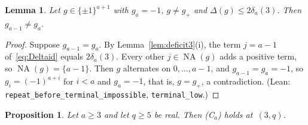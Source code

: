 \documentclass[11pt]{article}
\newtheorem{lemma}[theorem]{Lemma}
\newtheorem{proposition}[theorem]{Proposition}
\theoremstyle{remark}
\newcommand{\NA}{\operatorname{NA}}
\begin{document}
\begin{lemma}\label{lem:terminal}
Let $g\in\{\pm1\}^{a+1}$ with $g_a=-1$, $g\ne g_+$ and $\Delta(g)\le2\delta_a(3)$.
Then $g_{a-1}\ne g_a$.
\end{lemma}
\begin{proof}
Suppose $g_{a-1}=g_a$. By Lemma~\ref{lem:deficit3}(i), the term $j=a-1$
of~\eqref{eq:Deltaid} equals $2\delta_a(3)$. Every other $j\in\NA(g)$ adds a
positive term, so $\NA(g)=\{a-1\}$. Then $g$ alternates on $0,\dots,a-1$, and
$g_{a-1}=g_a=-1$, so $g_i=(-1)^{a+i}$ for $i<a$ and $g_a=-1$, that is, $g=g_+$, a
contradiction. (Lean: \texttt{repeat\_before\_terminal\_impossible},
\texttt{terminal\_low}.)
\end{proof}

\begin{proposition}\label{prop:C}
Let $a\ge3$ and let $q\ge5$ be real. Then (C$_a$) holds at~$(3,q)$.
\end{proposition}
\end{document}
